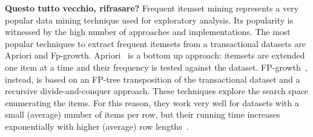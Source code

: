 \textbf{Questo tutto vecchio, rifrasare?} Frequent itemset mining represents a very popular data mining technique 
used for exploratory analysis. 
Its popularity is witnessed by the high number of approaches 
and implementations. 
The most popular techniques to extract frequent itemsets
from a transactional datasets are Apriori and Fp-growth.
Apriori~\cite{Agr94} is a bottom up approach: 
itemsets are extended one item at a time and their frequency is tested against the dataset. 
FP-growth~\cite{Han00}, instead, is based on an FP-tree transposition of the transactional dataset 
and a recursive divide-and-conquer approach. 
These techniques explore the search space enumerating the items. 
For this reason, they work very well for datasets 
with a small (average) number of items per row, 
but their running time increases exponentially 
with higher (average) row lengths~\cite{Zaki97newalgorithms, Agr94}.

